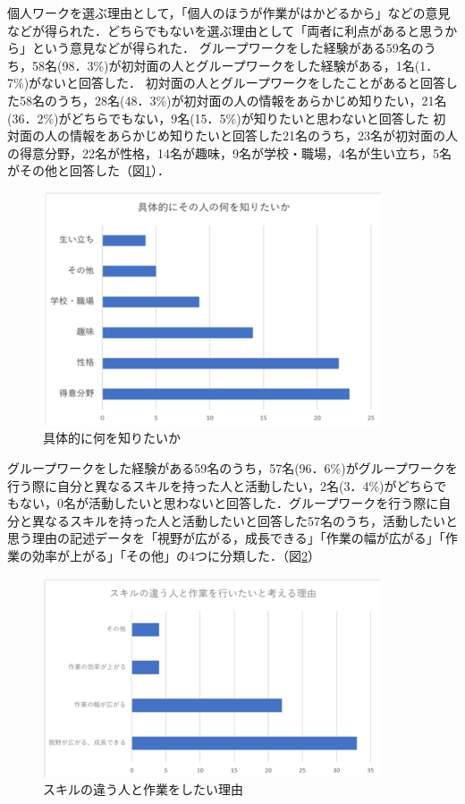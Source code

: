 \documentclass{funthesis}
\begin{document}
個人ワークを選ぶ理由として，「個人のほうが作業がはかどるから」などの意見などが得られた．どちらでもないを選ぶ理由として「両者に利点があると思うから」という意見などが得られた．
グループワークをした経験がある59名のうち，58名(98．3\%)が初対面の人とグループワークをした経験がある，1名(1．7\%)がないと回答した．
初対面の人とグループワークをしたことがあると回答した58名のうち，28名(48．3\%)が初対面の人の情報をあらかじめ知りたい，21名(36．2\%)がどちらでもない，9名(15．5\%)が知りたいと思わないと回答した 
初対面の人の情報をあらかじめ知りたいと回答した21名のうち，23名が初対面の人の得意分野，22名が性格，14名が趣味，9名が学校・職場，4名が生い立ち，5名がその他と回答した（図\ref{graph2}）．

\begin{figure}[h]
 \centering
   \includegraphics[width=100mm]{figures/graph2.png}
 \caption{具体的に何を知りたいか}
 \label{graph2}
\end{figure}

グループワークをした経験がある59名のうち，57名(96．6\%)がグループワークを行う際に自分と異なるスキルを持った人と活動したい，2名(3．4\%)がどちらでもない，0名が活動したいと思わないと回答した．グループワークを行う際に自分と異なるスキルを持った人と活動したいと回答した57名のうち，活動したいと思う理由の記述データを「視野が広がる，成長できる」「作業の幅が広がる」「作業の効率が上がる」「その他」の4つに分類した．（図\ref{graph3}）

\begin{figure}[h]
 \centering
   \includegraphics[width=100mm]{figures/graph3.png}
 \caption{スキルの違う人と作業をしたい理由}
 \label{graph3}
\end{figure}
\end{document}
